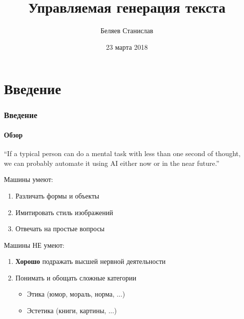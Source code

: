 \documentclass[10pt]{beamer}
\title[Управляемая генерация текста]{Управляемая генерация текста%
}
\author[Беляев Станислав]{
Беляев Станислав%
}
\institute[СПбАУ]
{
Санкт-Петербургский Академический Университет \\
\medskip
\textit{stasbelyaev96@gmail.com}
}
\date{23 марта 2018}
\begin{document}
\begin{frame}
\titlepage
\end{frame}
\section{Введение}
\begin{frame}
\frametitle{Введение}
\framesubtitle{Обзор}

\begin{exampleblock}{}
  {\Large “If a typical person can do a mental task with less than one second of thought, we can probably automate it using AI either now or in the near future.”}
  \vskip2mm
  \hspace*{}
\end{exampleblock}

Машины умеют:
\begin{enumerate}
    \item Различать формы и объекты
    \item Имитировать стиль изображений
    \item Отвечать на простые вопросы
\end{enumerate}

Машины НЕ умеют:
\begin{enumerate}
    \item \textbf{Хорошо} подражать высшей нервной деятельности
    \item Понимать и обощать сложные категории
    \begin{itemize}
        \item Этика (юмор, мораль, норма, ...)
        \item Эстетика (книги, картины, ...)
    \end{itemize}
\end{enumerate}

\end{frame}
\end{document}
